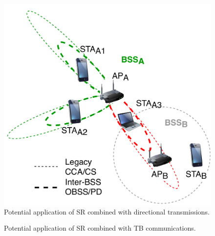 \documentclass[preprint,12pt]{elsarticle}
\theoremstyle{plain}
\begin{document}
\begin{figure}[ht!]
	\centering        
	\includegraphics[width=0.4\columnwidth]{sr_and_beamforming}
	\caption{Potential application of SR combined with directional transmissions.}
	\label{fig:sr_and_beamforming}
\end{figure}

\begin{figure}[ht!]
	\centering        
	\caption{Potential application of SR combined with TB communications.}        
	\label{fig:sr_and_tb}
\end{figure}
\end{document}
